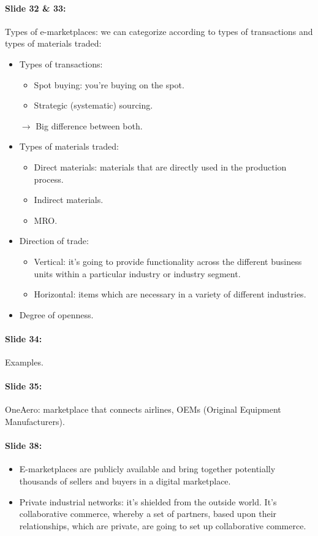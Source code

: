 \documentclass[10pt,a4paper]{report}
\begin{document}
\paragraph{Slide 32 \& 33:} Types of e-marketplaces: we can categorize according to types of transactions and types of materials traded:
\begin{itemize}
\item Types of transactions:
\begin{itemize}
\item Spot buying: you're buying on the spot.
\item Strategic (systematic) sourcing.
\end{itemize}
$\rightarrow$ Big difference between both.
\item Types of materials traded:
\begin{itemize}
\item Direct materials: materials that are directly used in the production process.
\item Indirect materials.
\item MRO.
\end{itemize}
\item Direction of trade:
\begin{itemize}
\item Vertical: it's going to provide functionality across the different business units within a particular industry or industry segment.
\item Horizontal: items which are necessary in a variety of different industries.
\end{itemize}
\item Degree of openness.
\end{itemize}	

\paragraph{Slide 34:}Examples.

\paragraph{Slide 35:}OneAero: marketplace that connects airlines, OEMs (Original Equipment Manufacturers).

\paragraph{Slide 38:}
\begin{itemize}
\item E-marketplaces are publicly available and bring together potentially thousands of sellers and buyers in a digital marketplace.
\item Private industrial networks: it's shielded from the outside world. It's collaborative commerce, whereby a set of partners, based upon their relationships, which are private, are going to set up collaborative commerce. 
\end{itemize}
\end{document}
